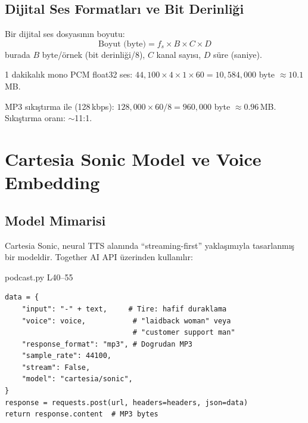 \subsection{Dijital Ses Formatlar{\i} ve Bit Derinli\u{g}i}

Bir dijital ses dosyas{\i}n{\i}n boyutu:
\begin{equation}
\label{eq:audio_size}
\text{Boyut (byte)} = f_s \times B \times C \times D
\end{equation}
burada $B$ byte/\"{o}rnek (bit derinli\u{g}i/8), $C$ kanal say{\i}s{\i}, $D$ s\"{u}re (saniye).

\begin{ornek}
1 dakikal{\i}k mono PCM float32 ses: $44{,}100 \times 4 \times 1 \times 60 = 10{,}584{,}000$ byte $\approx 10.1$\,MB.

MP3 s{\i}k{\i}\c{s}t{\i}rma ile (128\,kbps): $128{,}000 \times 60 / 8 = 960{,}000$ byte $\approx 0.96$\,MB. S{\i}k{\i}\c{s}t{\i}rma oran{\i}: $\sim$11:1.
\end{ornek}


\section{Cartesia Sonic Model ve Voice Embedding}
\label{sec:cartesia}

\subsection{Model Mimarisi}

Cartesia Sonic, neural TTS alan{\i}nda ``streaming-first'' yakla\c{s}{\i}m{\i}yla tasarlanm{\i}\c{s} bir modeldir. Together AI API \"{u}zerinden kullan{\i}l{\i}r:

\begin{kodref}{podcast.py L40--55}
\begin{lstlisting}[caption={Cartesia Sonic API \c{c}a\u{g}r{\i}s{\i}}]
data = {
    "input": "-" + text,     # Tire: hafif duraklama
    "voice": voice,           # "laidback woman" veya
                              # "customer support man"
    "response_format": "mp3", # Dogrudan MP3
    "sample_rate": 44100,
    "stream": False,
    "model": "cartesia/sonic",
}
response = requests.post(url, headers=headers, json=data)
return response.content  # MP3 bytes
\end{lstlisting}
\end{kodref}


